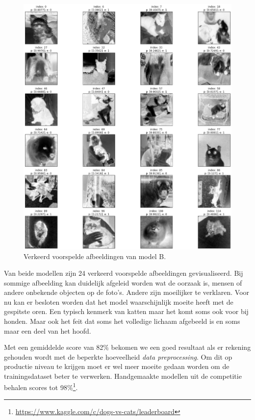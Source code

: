 \begin{figure}
    \centering
    \includegraphics[width=\linewidth]{img/autokeras-10-wrong-images.png}
    \caption{Verkeerd voorspelde afbeeldingen van model B.}
    \label{fig:wrong-prediction-autokeras-10}
\end{figure}

Van beide modellen zijn 24 verkeerd voorspelde afbeeldingen gevisualiseerd. Bij sommige afbeelding kan duidelijk afgeleid worden wat de oorzaak is, mensen of andere onbekende objecten op de foto's. Andere zijn moeilijker te verklaren. Voor nu kan er besloten worden dat het model waarschijnlijk moeite heeft met de gespitste oren. Een typisch kenmerk van katten maar het komt soms ook voor bij honden. Maar ook het feit dat soms het volledige lichaam afgebeeld is en soms maar een deel van het hoofd.

Met een gemiddelde score van 82\% bekomen we een goed resultaat als er rekening gehouden wordt met de beperkte hoeveelheid \textit{data preprocessing}. Om dit op productie niveau te krijgen moet er wel meer moeite gedaan worden om de trainingsdataset beter te verwerken. Handgemaakte modellen uit de competitie behalen scores tot 98\%\footnote{\url{https://www.kaggle.com/c/dogs-vs-cats/leaderboard}}.

